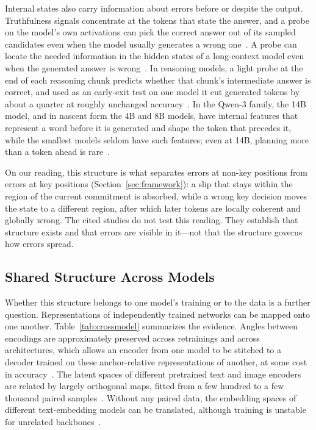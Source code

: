 \documentclass{ieeeaccess}
\begin{document}
Internal states also carry information about errors before or despite the output. Truthfulness signals concentrate at the tokens that state the answer, and a probe on the model's own activations can pick the correct answer out of its sampled candidates even when the model usually generates a wrong one~\cite{orgad2025know}. A probe can locate the needed information in the hidden states of a long-context model even when the generated answer is wrong~\cite{gao2024insights}. In reasoning models, a light probe at the end of each reasoning chunk predicts whether that chunk's intermediate answer is correct, and used as an early-exit test on one model it cut generated tokens by about a quarter at roughly unchanged accuracy~\cite{zhang2025reasoningprobe}. In the Qwen-3 family, the 14B model, and in nascent form the 4B and 8B models, have internal features that represent a word before it is generated and shape the token that precedes it, while the smallest models seldom have such features; even at 14B, planning more than a token ahead is rare~\cite{hanna2026planning}.

On our reading, this structure is what separates errors at non-key positions from errors at key positions (Section~\ref{sec:framework}): a slip that stays within the region of the current commitment is absorbed, while a wrong key decision moves the state to a different region, after which later tokens are locally coherent and globally wrong. The cited studies do not test this reading. They establish that structure exists and that errors are visible in it---not that the structure governs how errors spread.

\subsection{Shared Structure Across Models}
Whether this structure belongs to one model's training or to the data is a further question. Representations of independently trained networks can be mapped onto one another. Table~\ref{tab:crossmodel} summarizes the evidence. Angles between encodings are approximately preserved across retrainings and across architectures, which allows an encoder from one model to be stitched to a decoder trained on these anchor-relative representations of another, at some cost in accuracy~\cite{moschella2023relative}. The latent spaces of different pretrained text and image encoders are related by largely orthogonal maps, fitted from a few hundred to a few thousand paired samples~\cite{maiorca2023translation}. Without any paired data, the embedding spaces of different text-embedding models can be translated, although training is unstable for unrelated backbones~\cite{jha2025vec2vec}.
\end{document}
